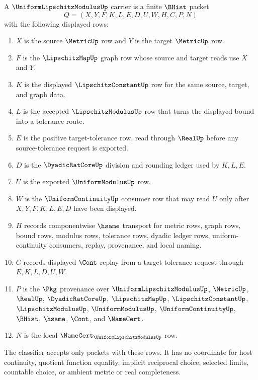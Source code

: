 \begin{definition}\label{def:uniform-lipschitz-modulus-carrier}
A $\UniformLipschitzModulusUp$ carrier is a finite $\BHist$ packet
$$
Q=(X,Y,F,K,L,E,D,U,W,H,C,P,N)
$$
with the following displayed rows:
\begin{enumerate}
\item $X$ is the source $\MetricUp$ row and $Y$ is the target $\MetricUp$ row.
\item $F$ is the $\LipschitzMapUp$ graph row whose source and target reads use $X$ and $Y$.
\item $K$ is the displayed $\LipschitzConstantUp$ row for the same source, target, and graph data.
\item $L$ is the accepted $\LipschitzModulusUp$ row that turns the displayed bound into a tolerance route.
\item $E$ is the positive target-tolerance row, read through $\RealUp$ before any source-tolerance request is exported.
\item $D$ is the $\DyadicRatCoreUp$ division and rounding ledger used by $K,L,E$.
\item $U$ is the exported $\UniformModulusUp$ row.
\item $W$ is the $\UniformContinuityUp$ consumer row that may read $U$ only after $X,Y,F,K,L,E,D$ have been displayed.
\item $H$ records componentwise $\hsame$ transport for metric rows, graph rows, bound rows, modulus rows, tolerance rows, dyadic ledger rows, uniform-continuity consumers, replay, provenance, and local naming.
\item $C$ records displayed $\Cont$ replay from a target-tolerance request through $E,K,L,D,U,W$.
\item $P$ is the $\Pkg$ provenance over $\UniformLipschitzModulusUp$, $\MetricUp$, $\RealUp$, $\DyadicRatCoreUp$, $\LipschitzMapUp$, $\LipschitzConstantUp$, $\LipschitzModulusUp$, $\UniformModulusUp$, $\UniformContinuityUp$, $\BHist$, $\hsame$, $\Cont$, and $\NameCert$.
\item $N$ is the local $\NameCert_{\UniformLipschitzModulusUp}$ row.
\end{enumerate}
The classifier accepts only packets with these rows. It has no coordinate for host continuity, quotient function equality, implicit reciprocal choice, selected limits, countable choice, or ambient metric or real completeness.
\end{definition}

